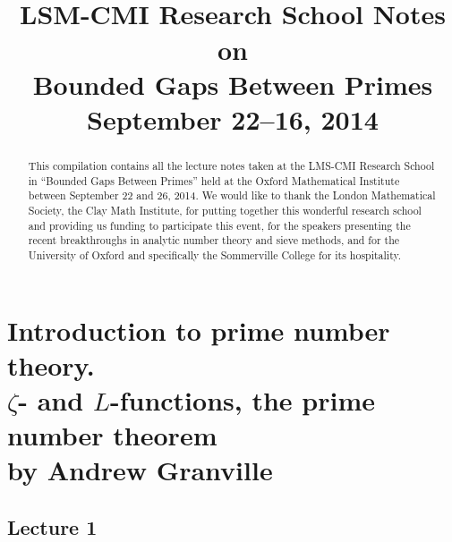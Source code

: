 \documentclass[12pt,amsfont]{amsart}
\begin{document}
\title{\bf\\LSM-CMI Research School Notes on \\Bounded Gaps Between Primes\\ September 22--16, 2014}
\begin{abstract}
This compilation contains all the lecture notes taken at the LMS-CMI Research School in ``Bounded Gaps Between Primes'' held at the Oxford Mathematical Institute between September 22 and 26, 2014.  We would like to thank the London Mathematical Society, the Clay Math Institute, for putting together this wonderful research school and providing us funding to participate this event, for the speakers presenting the recent breakthroughs in analytic number theory and sieve methods, and for the University of Oxford and specifically the Sommerville College for its hospitality.   
\end{abstract}
\maketitle
\setcounter{tocdepth}{2}
\tableofcontents

\newpage
\section{Introduction to prime number theory.\\ $\zeta$- and $L$-functions, the prime number theorem\\by Andrew Granville}\label{1}

\subsection{Lecture 1}
\end{document}
